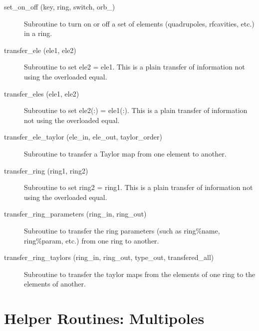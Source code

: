 \begin{description}
\item[set\_on\_off (key, ring, switch, orb\_)] \Newline
Subroutine to turn on or off a set of elements (quadrupoles,
rfcavities, etc.) in a ring.

\item[transfer\_ele (ele1, ele2)] \Newline 
     Subroutine to set ele2 = ele1. 
     This is a plain transfer of information not using the overloaded equal.

\item[transfer\_eles (ele1, ele2)] \Newline 
     Subroutine to set ele2(:) = ele1(:). 
     This is a plain transfer of information not using the overloaded equal.

\item[transfer\_ele\_taylor (ele\_in, ele\_out, taylor\_order)] \Newline 
     Subroutine to transfer a Taylor map from one element to another.

\item[transfer\_ring (ring1, ring2)] \Newline 
     Subroutine to set ring2 = ring1. 
     This is a plain transfer of information not using the overloaded equal.

\item[transfer\_ring\_parameters (ring\_in, ring\_out)] \Newline
Subroutine to transfer the ring parameters (such as ring\%name, 
ring\%param, etc.) from one ring to another. 

\item[transfer\_ring\_taylors (ring\_in, ring\_out, 
                        type\_out, transfered\_all) ] \Newline 
Subroutine to transfer the taylor maps from the elements of one ring to
the elements of another. 

\end{description}

\section{Helper Routines: Multipoles}
\label{r:multi}    

